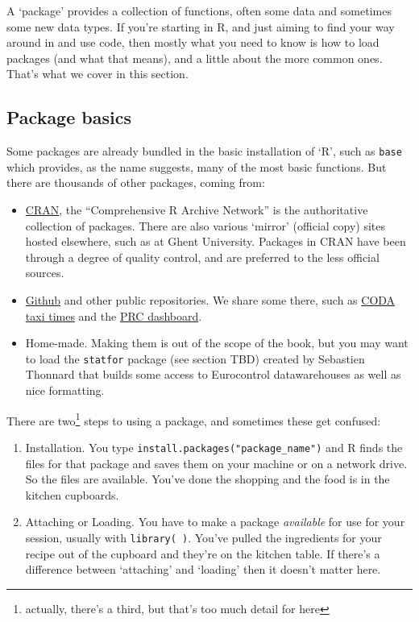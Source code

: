 \documentclass[
]{book}
\providecommand{\tightlist}{%
  \setlength{\itemsep}{0pt}\setlength{\parskip}{0pt}}
\begin{document}
A `package' provides a collection of functions, often some data and sometimes some new data types. If you're starting in R, and just aiming to find your way around in and use code, then mostly what you need to know is how to load packages (and what that means), and a little about the more common ones. That's what we cover in this section.

\hypertarget{package-basics}{%
\subsection{Package basics}\label{package-basics}}

Some packages are already bundled in the basic installation of `R', such as \texttt{base} which provides, as the name suggests, many of the most basic functions. But there are thousands of other packages, coming from:

\begin{itemize}
\tightlist
\item
  \href{https://cran.r-project.org}{CRAN}, the ``Comprehensive R Archive Network'' is the authoritative collection of packages. There are also various `mirror' (official copy) sites hosted elsewhere, such as at Ghent University. Packages in CRAN have been through a degree of quality control, and are preferred to the less official sources.
\item
  \href{https://github.com}{Github} and other public repositories. We share some there, such as \href{https://github.com/david6marsh/codaTaxi}{CODA taxi times} and the \href{https://github.com/euctrl-pru/portal}{PRC dashboard}.
\item
  Home-made. Making them is out of the scope of the book, but you may want to load the \texttt{statfor} package (see section TBD) created by Sebastien Thonnard that builds some access to Eurocontrol datawarehouses as well as nice formatting.
\end{itemize}

There are two\footnote{actually, there's a third, but that's too much detail for here} steps to using a package, and sometimes these get confused:

\begin{enumerate}
\def\labelenumi{\arabic{enumi})}
\tightlist
\item
  Installation. You type \texttt{install.packages("package\_name")} and R finds the files for that package and saves them on your machine or on a network drive. So the files are available. You've done the shopping and the food is in the kitchen cupboards.
\item
  Attaching or Loading. You have to make a package \emph{available} for use for your session, usually with \texttt{library(\ )}. You've pulled the ingredients for your recipe out of the cupboard and they're on the kitchen table. If there's a difference between `attaching' and `loading' then it doesn't matter here.
\end{enumerate}
\end{document}
